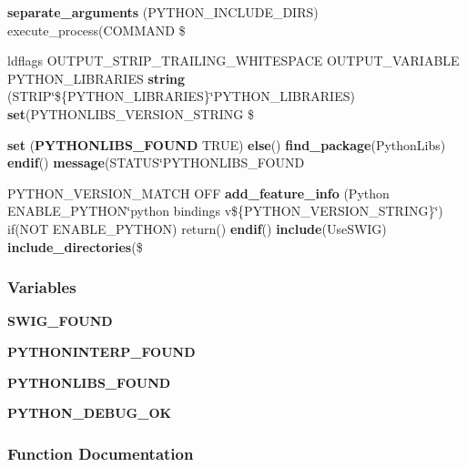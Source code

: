 \begin{DoxyCompactItemize}
\item 
{\bf separate\+\_\+arguments} (P\+Y\+T\+H\+O\+N\+\_\+\+I\+N\+C\+L\+U\+D\+E\+\_\+\+D\+I\+RS) execute\+\_\+process(C\+O\+M\+M\+A\+ND \$
\item 
ldflags O\+U\+T\+P\+U\+T\+\_\+\+S\+T\+R\+I\+P\+\_\+\+T\+R\+A\+I\+L\+I\+N\+G\+\_\+\+W\+H\+I\+T\+E\+S\+P\+A\+CE O\+U\+T\+P\+U\+T\+\_\+\+V\+A\+R\+I\+A\+B\+LE P\+Y\+T\+H\+O\+N\+\_\+\+L\+I\+B\+R\+A\+R\+I\+ES {\bf string} (S\+T\+R\+IP\char`\"{}\$\{P\+Y\+T\+H\+O\+N\+\_\+\+L\+I\+B\+R\+A\+R\+I\+ES\}\char`\"{}P\+Y\+T\+H\+O\+N\+\_\+\+L\+I\+B\+R\+A\+R\+I\+ES) {\bf set}(P\+Y\+T\+H\+O\+N\+L\+I\+B\+S\+\_\+\+V\+E\+R\+S\+I\+O\+N\+\_\+\+S\+T\+R\+I\+NG \$
\item 
{\bf set} ({\bf P\+Y\+T\+H\+O\+N\+L\+I\+B\+S\+\_\+\+F\+O\+U\+ND} T\+R\+UE) {\bf else}() {\bf find\+\_\+package}(Python\+Libs) {\bf endif}() {\bf message}(S\+T\+A\+T\+US\char`\"{}P\+Y\+T\+H\+O\+N\+L\+I\+B\+S\+\_\+\+F\+O\+U\+ND
\item 
P\+Y\+T\+H\+O\+N\+\_\+\+V\+E\+R\+S\+I\+O\+N\+\_\+\+M\+A\+T\+CH O\+FF {\bf add\+\_\+feature\+\_\+info} (Python E\+N\+A\+B\+L\+E\+\_\+\+P\+Y\+T\+H\+ON\char`\"{}python bindings v\$\{P\+Y\+T\+H\+O\+N\+\_\+\+V\+E\+R\+S\+I\+O\+N\+\_\+\+S\+T\+R\+I\+NG\}\char`\"{}) if(N\+OT E\+N\+A\+B\+L\+E\+\_\+\+P\+Y\+T\+H\+ON) return() {\bf endif}() {\bf include}(Use\+S\+W\+IG) {\bf include\+\_\+directories}(\$
\end{DoxyCompactItemize}
\subsubsection*{Variables}
\begin{DoxyCompactItemize}
\item 
{\bf S\+W\+I\+G\+\_\+\+F\+O\+U\+ND}
\item 
{\bf P\+Y\+T\+H\+O\+N\+I\+N\+T\+E\+R\+P\+\_\+\+F\+O\+U\+ND}
\item 
{\bf P\+Y\+T\+H\+O\+N\+L\+I\+B\+S\+\_\+\+F\+O\+U\+ND}
\item 
{\bf P\+Y\+T\+H\+O\+N\+\_\+\+D\+E\+B\+U\+G\+\_\+\+OK}
\end{DoxyCompactItemize}


\subsubsection{Function Documentation}

